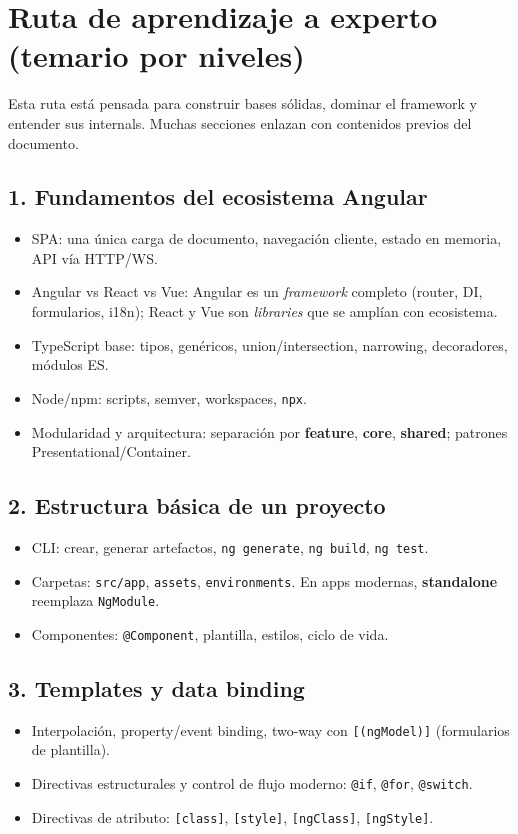 \documentclass[11pt,a4paper]{article}
\begin{document}
\section{Ruta de aprendizaje a experto (temario por niveles)}
Esta ruta está pensada para construir bases sólidas, dominar el framework y entender sus internals. Muchas secciones enlazan con contenidos previos del documento.

\subsection{1. Fundamentos del ecosistema Angular}
\begin{itemize}[leftmargin=*]
  \item SPA: una única carga de documento, navegación cliente, estado en memoria, API vía HTTP/WS.
  \item Angular vs React vs Vue: Angular es un \emph{framework} completo (router, DI, formularios, i18n); React y Vue son \emph{libraries} que se amplían con ecosistema.
  \item TypeScript base: tipos, genéricos, union/intersection, narrowing, decoradores, módulos ES.
  \item Node/npm: scripts, semver, workspaces, \texttt{npx}.
  \item Modularidad y arquitectura: separación por \textbf{feature}, \textbf{core}, \textbf{shared}; patrones Presentational/Container.
\end{itemize}

\subsection{2. Estructura básica de un proyecto}
\begin{itemize}[leftmargin=*]
  \item CLI: crear, generar artefactos, \texttt{ng generate}, \texttt{ng build}, \texttt{ng test}.
  \item Carpetas: \texttt{src/app}, \texttt{assets}, \texttt{environments}. En apps modernas, \textbf{standalone} reemplaza \texttt{NgModule}.
  \item Componentes: \texttt{@Component}, plantilla, estilos, ciclo de vida.
\end{itemize}

\subsection{3. Templates y data binding}
\begin{itemize}[leftmargin=*]
  \item Interpolación, property/event binding, two-way con \texttt{[(ngModel)]} (formularios de plantilla).
  \item Directivas estructurales y control de flujo moderno: \texttt{@if}, \texttt{@for}, \texttt{@switch}.
  \item Directivas de atributo: \texttt{[class]}, \texttt{[style]}, \texttt{[ngClass]}, \texttt{[ngStyle]}.
\end{itemize}
\end{document}
